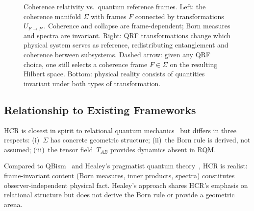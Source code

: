 \documentclass[aps,prd,twocolumn,superscriptaddress,nofootinbib,floatfix]{revtex4-2}
\newcommand{\Sig}{\Sigma}
\newcommand{\Tab}{T_{AB}}
\newcommand{\HCR}{HCR}
\newcommand{\CR}{\HCR}  %
\begin{document}
\begin{figure}[t]
\caption{Coherence relativity vs.\ quantum reference frames. Left: the coherence manifold $\Sig$ with frames $F$ connected by transformations $U_{F\to F'}$. Coherence and collapse are frame-dependent; Born measures and spectra are invariant. Right: QRF transformations change which physical system serves as reference, redistributing entanglement and coherence between subsystems. Dashed arrow: given any QRF choice, one still selects a coherence frame $F \in \Sig$ on the resulting Hilbert space. Bottom: physical reality consists of quantities invariant under both types of transformation.}
\label{fig:sigma-qrf}
\end{figure}

\subsection{Relationship to Existing Frameworks}

\CR{} is closest in spirit to relational quantum mechanics~\cite{rovelliRelationalQuantumMechanics1996} but differs in three respects: (i)~$\Sig$ has concrete geometric structure; (ii)~the Born rule is derived, not assumed; (iii)~the tensor field~$\Tab$ provides dynamics absent in RQM.

Compared to QBism~\cite{fuchsIntroductionQBism2014} and Healey's pragmatist quantum theory~\cite{healeyQuantumRevolutionPhilosophy2017}, \CR{} is realist: frame-invariant content (Born measures, inner products, spectra) constitutes observer-independent physical fact. Healey's approach shares \CR{}'s emphasis on relational structure but does not derive the Born rule or provide a geometric arena.
\end{document}
